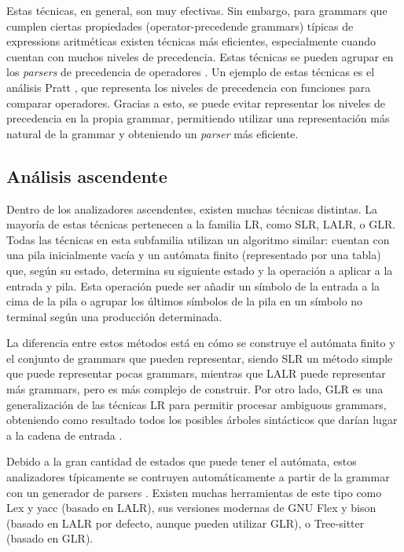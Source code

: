 Estas técnicas, en general, son muy efectivas. Sin embargo, para \glspl{grammar}
que cumplen ciertas propiedades (\glspl{operator-precedende grammar}) típicas de
\glspl{expression} aritméticas existen técnicas más eficientes, especialmente
cuando cuentan con muchos niveles de precedencia. Estas técnicas se pueden
agrupar en los \textit{\glspl{parser}} de precedencia de operadores
\parencite{operator-precedence-parser}. Un ejemplo de estas técnicas es el
análisis Pratt \parencite{pratt-parsing-paper}
\parencite{pratt-parsing-example}, que representa los niveles de precedencia con
funciones para comparar operadores. Gracias a esto, se puede evitar representar
los niveles de precedencia en la propia \gls{grammar}, permitiendo utilizar una
representación más natural de la \gls{grammar} y obteniendo un
\textit{\gls{parser}} más eficiente.

\subsection{Análisis ascendente}

Dentro de los analizadores ascendentes, existen muchas técnicas distintas. La
mayoría de estas técnicas pertenecen a la familia LR, como SLR, LALR, o GLR.
Todas las técnicas en esta subfamilia utilizan un algoritmo similar: cuentan con
una pila inicialmente vacía y un autómata finito (representado por una tabla)
que, según su estado, determina su siguiente estado y la operación a aplicar a
la entrada y pila. Esta operación puede ser añadir un símbolo de la entrada a la
cima de la pila o agrupar los últimos símbolos de la pila en un símbolo no
terminal según una producción determinada. \parencite{dragon-book} 

La diferencia entre estos métodos está en cómo se construye el autómata finito y
el conjunto de \glspl{grammar} que pueden representar, siendo SLR un método
simple que puede representar pocas \glspl{grammar}, mientras que LALR puede
representar más \glspl{grammar}, pero es más complejo de construir.
\parencite{dragon-book} Por otro lado, GLR es una generalización de las técnicas
LR para permitir procesar \glspl{ambiguous grammar}, obteniendo como resultado
todos los posibles árboles sintácticos que darían lugar a la cadena de entrada
\parencite{GLR-algorithm}.

Debido a la gran cantidad de estados que puede tener el autómata, estos
analizadores típicamente se contruyen automáticamente a partir de la
\gls{grammar} con un generador de \glspl{parser} \parencite{dragon-book}.
Existen muchas herramientas de este tipo como Lex y yacc \parencite{yacc}
(basado en LALR), sus versiones modernas de GNU Flex y bison \parencite{bison}
(basado en LALR por defecto, aunque pueden utilizar GLR), o Tree-sitter
\parencite{tree-sitter} (basado en GLR).

